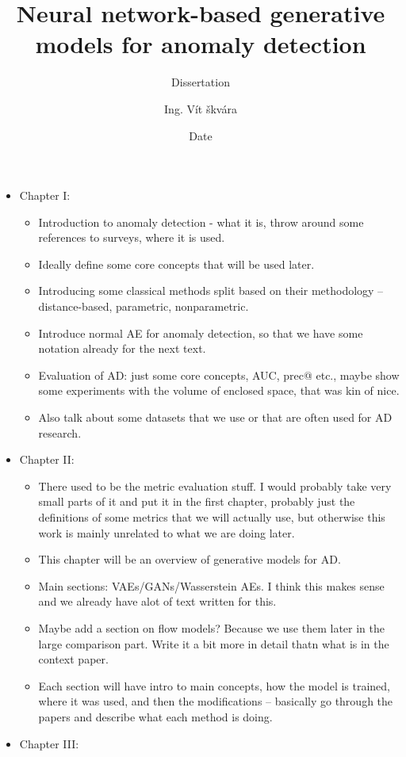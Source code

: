 \documentclass[twoside, a4paper, 12pt]{book}
\title{Neural network-based generative models for anomaly detection}
\subtitle{Dissertation}
\author{Ing. Vít škvára}
\date{Date}
\begin{document}
\maketitle


\begin{itemize}
	\item Chapter I: 
		\begin{itemize}
			\item Introduction to anomaly detection - what it is, throw around some references to surveys, where it is used.
			\item Ideally define some core concepts that will be used later.
			\item Introducing some classical methods split based on their methodology -- distance-based, parametric, nonparametric.
			\item Introduce normal AE for anomaly detection, so that we have some notation already for the next text.
			\item Evaluation of AD: just some core concepts, AUC, prec@ etc., maybe show some experiments with the volume of enclosed space, that was kin of nice.
			\item Also talk about some datasets that we use or that are often used for AD research.
		\end{itemize}
	\item Chapter II:
	\begin{itemize}
			\item There used to be the metric evaluation stuff. I would probably take very small parts of it and put it in the first chapter, probably just the definitions of some metrics that we will actually use, but otherwise this work is mainly unrelated to what we are doing later.
			\item This chapter will be an overview of generative models for AD.
			\item Main sections: VAEs/GANs/Wasserstein AEs. I think this makes sense and we already have alot of text written for this.
			\item Maybe add a section on flow models? Because we use them later in the large comparison part. Write it a bit more in detail thatn what is in the context paper.
			\item Each section will have intro to main concepts, how the model is trained, where it was used, and then the modifications -- basically go through the papers and describe what each method is doing.
		\end{itemize}
	\item Chapter III: 

\end{itemize}
\end{document}
